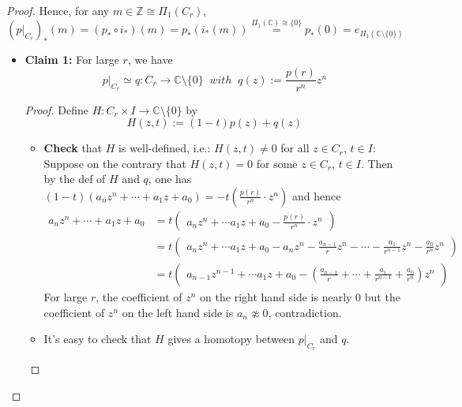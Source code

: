 \begin{proof}
    Hence, for any $m \in \mathbb{Z} \cong \Pi_1 (C_r)$,
    \begin{equation*}
        (p|_{C_r})_* (m) = (p_* \circ i_*) (m) = p_*(i_*(m)) \overset{\Pi_1 (\mathbb{C}) \cong \{0\}}{=} p_*(0) = e_{\Pi_1({\mathbb{C} \setminus \{0\}} )} \tag{\#}
    \end{equation*}
    \begin{itemize}
        \item \textbf{Claim 1:} For large $r$, we have
        $$p|_{C_r} \simeq q: C_r \to \mathbb{C} \setminus \{0\} \;\;with\;\;q(z) := \frac{p(r)}{r^n} z^n$$
        \begin{proof}
            Define $H: C_r \times I \to \mathbb{C} \setminus \{0\}$ by
            $$H(z,t) := (1-t) p(z) + q(z)$$
            \begin{itemize}
                \item \textbf{Check} that $H$ is well-defined, i.e.: $H (z,t) \neq 0$ for all $z \in C_r$, $t\in I$: Suppose on the contrary that $H( z,t) =0$ for some $z \in C_r$, $t \in I$. Then by the def of $H$ and $q$, one has $(1-t) (a_n z^n + \cdots + a_1z + a_0) = -t (\frac{p(r)}{r^n} \cdot z^n)$ and hence
                \begin{align*}
                    a_n z^n + \cdots + a_1z +a_0&= t \begin{pmatrix}
                        a_n z^n + \cdots a_1z+ a_0 - \frac{p(r)}{r^n} \cdot z^n
                    \end{pmatrix}\\
                    &= t \begin{pmatrix}
                        a_n z^n + \cdots a_1z+ a_0 - a_n z^n - \frac{a_{n-1}}{r}z^n - \cdots - \frac{a_{1}}{r^{n-1}} z^n - \frac{a_0}{r^n} z^n
                    \end{pmatrix}\\
                    &= t \begin{pmatrix}
                        a_{n-1} z^{n-1} + \cdots a_1z+ a_0 - (\frac{a_{n-1}}{r} + \cdots + \frac{a_{1}}{r^{n-1}} + \frac{a_0}{r^n} )z^n
                    \end{pmatrix}
                \end{align*}
                For large $r$, the coefficient of $z^n$ on the right hand side is nearly $0$ but the coefficient of $z^n$ on the left hand side is $a_n \not \approx 0$, contradiction.
                \item It's easy to check that $H$ gives a homotopy between $p|_{C_r}$ and $q$.

\end{itemize}
\end{proof}
\end{itemize}
\end{proof}
